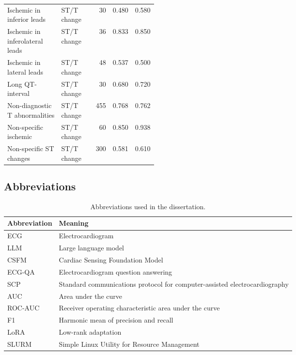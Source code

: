 \begin{longtable}{p{0.36\linewidth}lrrr}
Ischemic in inferior leads & ST/T change & 30 & 0.480 & 0.580 \\
Ischemic in inferolateral leads & ST/T change & 36 & 0.833 & 0.850 \\
Ischemic in lateral leads & ST/T change & 48 & 0.537 & 0.500 \\
Long QT-interval & ST/T change & 30 & 0.680 & 0.720 \\
Non-diagnostic T abnormalities & ST/T change & 455 & 0.768 & 0.762 \\
Non-specific ischemic & ST/T change & 60 & 0.850 & 0.938 \\
Non-specific ST changes & ST/T change & 300 & 0.581 & 0.610 \\
\hline
\end{longtable}
\normalsize

\subsection{Abbreviations}
\label{app:abbreviations}

\begin{table}[H]
\centering
\caption{Abbreviations used in the dissertation.}
\label{tab:appendix_abbreviations}
\begin{tabular}{ll}
\hline
\textbf{Abbreviation} & \textbf{Meaning} \\
\hline
ECG & Electrocardiogram \\
LLM & Large language model \\
CSFM & Cardiac Sensing Foundation Model \\
ECG-QA & Electrocardiogram question answering \\
SCP & Standard communications protocol for computer-assisted electrocardiography \\
AUC & Area under the curve \\
ROC-AUC & Receiver operating characteristic area under the curve \\
F1 & Harmonic mean of precision and recall \\
LoRA & Low-rank adaptation \\
SLURM & Simple Linux Utility for Resource Management \\
\hline
\end{tabular}
\end{table}
